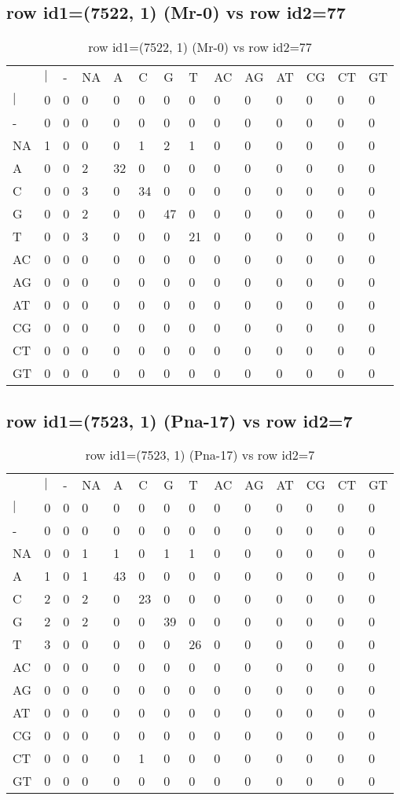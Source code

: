 \subsection{row id1=(7522, 1) (Mr-0) vs row id2=77}
\begin{center}
\begin{longtable}{|l|l|l|l|l|l|l|l|l|l|l|l|l|l|}
\caption{row id1=(7522, 1) (Mr-0) vs row id2=77} \label{table_dm332}\\
\hline
\\
\hline
&$|$&-&NA&A&C&G&T&AC&AG&AT&CG&CT&GT\\
$|$&0&0&0&0&0&0&0&0&0&0&0&0&0\\
-&0&0&0&0&0&0&0&0&0&0&0&0&0\\
NA&1&0&0&0&1&2&1&0&0&0&0&0&0\\
A&0&0&2&32&0&0&0&0&0&0&0&0&0\\
C&0&0&3&0&34&0&0&0&0&0&0&0&0\\
G&0&0&2&0&0&47&0&0&0&0&0&0&0\\
T&0&0&3&0&0&0&21&0&0&0&0&0&0\\
AC&0&0&0&0&0&0&0&0&0&0&0&0&0\\
AG&0&0&0&0&0&0&0&0&0&0&0&0&0\\
AT&0&0&0&0&0&0&0&0&0&0&0&0&0\\
CG&0&0&0&0&0&0&0&0&0&0&0&0&0\\
CT&0&0&0&0&0&0&0&0&0&0&0&0&0\\
GT&0&0&0&0&0&0&0&0&0&0&0&0&0\\
\hline
\end{longtable}
\end{center}

\subsection{row id1=(7523, 1) (Pna-17) vs row id2=7}
\begin{center}
\begin{longtable}{|l|l|l|l|l|l|l|l|l|l|l|l|l|l|}
\caption{row id1=(7523, 1) (Pna-17) vs row id2=7} \label{table_dm334}\\
\hline
\\
\hline
&$|$&-&NA&A&C&G&T&AC&AG&AT&CG&CT&GT\\
$|$&0&0&0&0&0&0&0&0&0&0&0&0&0\\
-&0&0&0&0&0&0&0&0&0&0&0&0&0\\
NA&0&0&1&1&0&1&1&0&0&0&0&0&0\\
A&1&0&1&43&0&0&0&0&0&0&0&0&0\\
C&2&0&2&0&23&0&0&0&0&0&0&0&0\\
G&2&0&2&0&0&39&0&0&0&0&0&0&0\\
T&3&0&0&0&0&0&26&0&0&0&0&0&0\\
AC&0&0&0&0&0&0&0&0&0&0&0&0&0\\
AG&0&0&0&0&0&0&0&0&0&0&0&0&0\\
AT&0&0&0&0&0&0&0&0&0&0&0&0&0\\
CG&0&0&0&0&0&0&0&0&0&0&0&0&0\\
CT&0&0&0&0&1&0&0&0&0&0&0&0&0\\
GT&0&0&0&0&0&0&0&0&0&0&0&0&0\\
\hline
\end{longtable}
\end{center}

